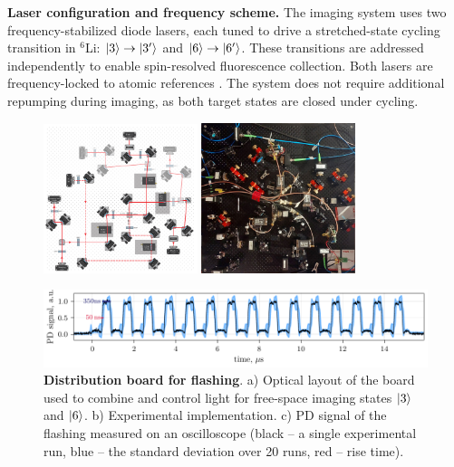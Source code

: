


\textbf{Laser configuration and frequency scheme.}  
The imaging system uses two frequency-stabilized diode lasers, each tuned to drive a stretched-state cycling transition in ${}^6$Li: $\left| 3 \right\rangle \rightarrow \left| 3' \right\rangle$ and $\left| 6 \right\rangle \rightarrow \left| 6' \right\rangle$. These transitions are addressed independently to enable spin-resolved fluorescence collection. Both lasers are frequency-locked to atomic references . The system does not require additional repumping during imaging, as both target states are closed under cycling.


\begin{figure}
    \centering
     \phantom{4}
    \includegraphics[width=0.4\textwidth]{fig-ai/flashing-distribution-scheme.pdf}
    \hspace{10 mm} 
     \phantom{4}
    \includegraphics[width=0.4\textwidth]{imgs/flashing-distribution-img.jpg}

    \includegraphics{fig-py/flashing-oscilloscope.pdf}

    \caption{
        \textbf{Distribution board for flashing}. 
        a) Optical layout of the board used to combine and control light for free-space imaging states $\left| 3 \right\rangle$ and $\left| 6 \right\rangle$.
        b) Experimental implementation.
        c) PD signal of the flashing measured on an oscilloscope (black -- a single experimental run, blue -- the standard deviation over 20 runs, red -- rise time).
    }
    \label{fig:flashing}
\end{figure}

